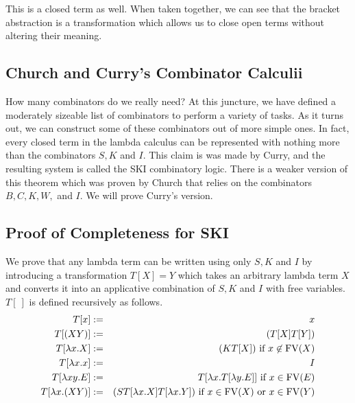 This is a closed term as well. When taken together, we can see that the bracket abstraction is a transformation which allows us to close open terms without altering their meaning.

\subsection{Church and Curry's Combinator Calculii}
How many combinators do we really need? At this juncture, we have defined a moderately sizeable list of combinators to perform a variety of tasks. As it turns out, we can construct some of these combinators out of more simple ones. In fact, every closed term in the lambda calculus can be represented with nothing more than the combinators $S,K$ and $I$. This claim is was made by Curry, and the resulting system is called the SKI combinatory logic. There is a weaker version of this theorem which was proven by Church that relies on the combinators $B,C,K,W,$ and $I$. We will prove Curry's version.\\


\subsection{Proof of Completeness for SKI}
We prove that any lambda term can be written using only $S,K$ and $I$ by introducing a transformation $T[X] = Y$ which takes an arbitrary lambda term $X$ and converts it into an applicative combination of $S,K$ and $I$ with free variables. $T[\ ]$ is defined recursively as follows.
\begin{eqnarray*}
  T[x] &:=& x\\
  T[(XY)] &:=& (T[X] T[Y])\\
  T[\lambda x.X] &:=& (K T[X])\hbox{ if $x \not\in \hbox{FV}(X)$}\\
  T[\lambda x.x] &:=& I\\
  T[\lambda xy.E] &:=& T[\lambda x.T[\lambda y.E]]\hbox{ if $x \in \hbox{FV}(E)$}\\
  T[\lambda x.(XY)] &:=& (S T[\lambda x.X] T[\lambda x.Y])\hbox{ if $x \in \hbox{FV}(X)$ or $x \in \hbox{FV}(Y)$}
\end{eqnarray*}

